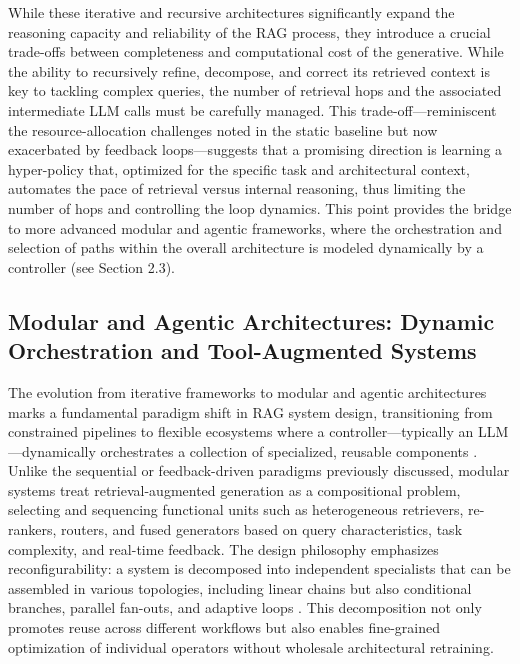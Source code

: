 \documentclass[11pt,a4paper]{article}
\begin{document}
While these iterative and recursive architectures significantly expand the reasoning capacity and reliability of the RAG process, they introduce a crucial trade-offs between completeness and computational cost of the generative. While the ability to recursively refine, decompose, and correct its retrieved context is key to tackling complex queries, the number of retrieval hops and the associated intermediate LLM calls must be carefully managed. This trade-off---reminiscent the resource-allocation challenges noted in the static baseline but now exacerbated by feedback loops---suggests that a promising direction is learning a hyper-policy that, optimized for the specific task and architectural context, automates the pace of retrieval versus internal reasoning, thus limiting the number of hops and controlling the loop dynamics. This point provides the bridge to more advanced modular and agentic frameworks, where the orchestration and selection of paths within the overall architecture is modeled dynamically by a controller (see Section 2.3).


\subsection{Modular and Agentic Architectures: Dynamic Orchestration and Tool-Augmented Systems}


The evolution from iterative frameworks to modular and agentic architectures marks a fundamental paradigm shift in RAG system design, transitioning from constrained pipelines to flexible ecosystems where a controller---typically an LLM---dynamically orchestrates a collection of specialized, reusable components \cite{arxiv:2407.21059v1}. Unlike the sequential or feedback-driven paradigms previously discussed, modular systems treat retrieval-augmented generation as a compositional problem, selecting and sequencing functional units such as heterogeneous retrievers, re-rankers, routers, and fused generators based on query characteristics, task complexity, and real-time feedback. The design philosophy emphasizes reconfigurability: a system is decomposed into independent specialists that can be assembled in various topologies, including linear chains but also conditional branches, parallel fan-outs, and adaptive loops \cite{arxiv:2407.21059v1}. This decomposition not only promotes reuse across different workflows but also enables fine-grained optimization of individual operators without wholesale architectural retraining.
\end{document}
